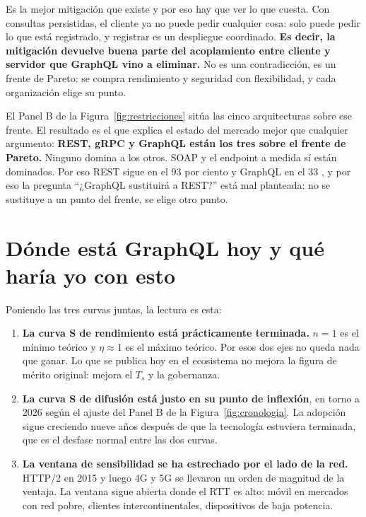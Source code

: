 \documentclass[11pt,letterpaper]{article}
\begin{document}
Es la mejor mitigación que existe y por eso hay que ver lo que cuesta. Con
consultas persistidas, el cliente ya no puede pedir cualquier cosa: solo puede
pedir lo que está registrado, y registrar es un despliegue coordinado.
\textbf{Es decir, la mitigación devuelve buena parte del acoplamiento entre
cliente y servidor que GraphQL vino a eliminar.} No es una contradicción, es un
frente de Pareto: se compra rendimiento y seguridad con flexibilidad, y cada
organización elige su punto.

El Panel B de la Figura~\ref{fig:restricciones} sitúa las cinco arquitecturas
sobre ese frente. El resultado es el que explica el estado del mercado mejor
que cualquier argumento: \textbf{REST, gRPC y GraphQL están los tres sobre el
frente de Pareto.} Ninguno domina a los otros. SOAP y el endpoint a medida sí
están dominados. Por eso REST sigue en el 93 por ciento y GraphQL en el 33
\parencite{postman2025}, y por eso la pregunta \enquote{¿GraphQL sustituirá a
REST?} está mal planteada: no se sustituye a un punto del frente, se elige otro
punto.

\section{Dónde está GraphQL hoy y qué haría yo con esto}

Poniendo las tres curvas juntas, la lectura es esta:

\begin{enumerate}
\item \textbf{La curva S de rendimiento está prácticamente terminada.} $n=1$ es
  el mínimo teórico y $\eta \approx 1$ es el máximo teórico. Por esos dos ejes
  no queda nada que ganar. Lo que se publica hoy en el ecosistema no mejora la
  figura de mérito original: mejora el $T_{s}$ y la gobernanza.
\item \textbf{La curva S de difusión está justo en su punto de inflexión}, en
  torno a 2026 según el ajuste del Panel B de la
  Figura~\ref{fig:cronologia}. La adopción sigue creciendo nueve años después
  de que la tecnología estuviera terminada, que es el desfase normal entre las
  dos curvas.
\item \textbf{La ventana de sensibilidad se ha estrechado por el lado de la
  red.} HTTP/2 en 2015 y luego 4G y 5G se llevaron un orden de magnitud de la
  ventaja. La ventana sigue abierta donde el RTT es alto: móvil en mercados con
  red pobre, clientes intercontinentales, dispositivos de baja potencia.
\end{enumerate}
\end{document}
